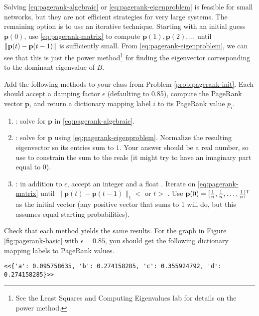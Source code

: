 Solving \eqref{eq:pagerank-algebraic} or \eqref{eq:pagerank-eigenproblem} is feasible for small networks, but they are not efficient strategies for very large systems.
The remaining option is to use an iterative technique.
Starting with an initial guess $\mathbf{p}(0)$, use  \eqref{eq:pagerank-matrix} to compute $\mathbf{p}(1),\mathbf{p}(2),\ldots$ until $\left\lVert\mathbf{p}(t)-\mathbf{p}(t-1)\right\rVert$ is sufficiently small.
From \eqref{eq:pagerank-eigenproblem}, we can see that this is just the power method\footnote{See the Least Squares and Computing Eigenvalues lab for details on the power method.} for finding the eigenvector corresponding to the dominant eigenvalue of $B$.

\begin{problem} %
Add the following methods to your class from Problem \ref{prob:pagerank-init}.
Each should accept a damping factor $\epsilon$ (defaulting to 0.85), compute the PageRank vector $\mathbf{p}$, and return a dictionary mapping label $i$ to its PageRank value $p_i$.

\begin{enumerate}
\item {}: solve for $\mathbf{p}$ in \eqref{eq:pagerank-algebraic}.
\item {}: solve for $\mathbf{p}$ using \eqref{eq:pagerank-eigenproblem}.
Normalize the resulting eigenvector so its entries sum to $1$.
Your answer should be a real number, so use  to constrain the sum to the reals (it might try to have an imaginary part equal to 0).
\item {}: in addition to $\epsilon$, accept an integer  and a float .
Iterate on \eqref{eq:pagerank-matrix} until $\|\mathbf{p}(t) - \mathbf{p}(t-1)\|_1 < $  or $t > $ .
Use $\mathbf{p}(0)=[\frac{1}{n},\frac{1}{n},\ldots,\frac{1}{n}]^{\mathsf T}$ as the initial vector (any positive vector that sums to $1$ will do, but this assumes equal starting probabilities).
\end{enumerate}
Check that each method yields the same results.
For the graph in Figure \ref{fig:pagerank-basic} with $\epsilon=0.85$, you should get the following dictionary mapping labels to PageRank values.
\begin{lstlisting}
<<{'a': 0.095758635, 'b': 0.274158285, 'c': 0.355924792, 'd': 0.274158285}>>
\end{lstlisting}
\label{prob:pagerank-computation}
\end{problem}


